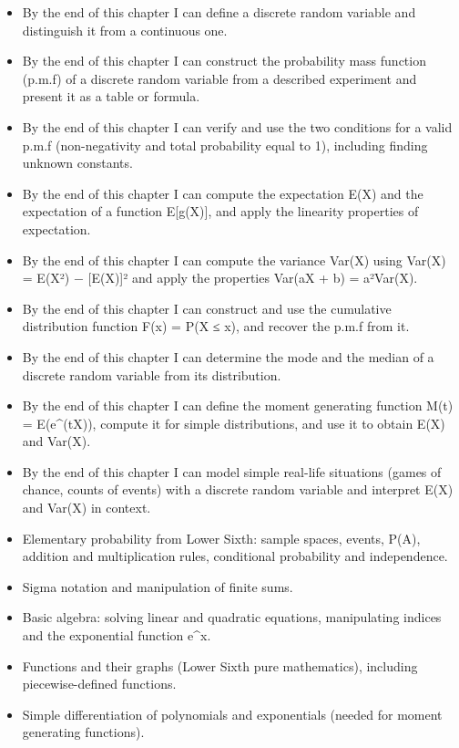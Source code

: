 \documentclass[11pt]{article}
\begin{document}
\begin{objectifs}
\begin{itemize}
\item By the end of this chapter I can define a discrete random variable and distinguish it from a continuous one.
\item By the end of this chapter I can construct the probability mass function (p.m.f) of a discrete random variable from a described experiment and present it as a table or formula.
\item By the end of this chapter I can verify and use the two conditions for a valid p.m.f (non-negativity and total probability equal to 1), including finding unknown constants.
\item By the end of this chapter I can compute the expectation E(X) and the expectation of a function E[g(X)], and apply the linearity properties of expectation.
\item By the end of this chapter I can compute the variance Var(X) using Var(X) = E(X²) − [E(X)]² and apply the properties Var(aX + b) = a²Var(X).
\item By the end of this chapter I can construct and use the cumulative distribution function F(x) = P(X ≤ x), and recover the p.m.f from it.
\item By the end of this chapter I can determine the mode and the median of a discrete random variable from its distribution.
\item By the end of this chapter I can define the moment generating function M(t) = E(e\^{}(tX)), compute it for simple distributions, and use it to obtain E(X) and Var(X).
\item By the end of this chapter I can model simple real-life situations (games of chance, counts of events) with a discrete random variable and interpret E(X) and Var(X) in context.
\end{itemize}
\end{objectifs}

\begin{prerequis}
\begin{itemize}
\item Elementary probability from Lower Sixth: sample spaces, events, P(A), addition and multiplication rules, conditional probability and independence.
\item Sigma notation and manipulation of finite sums.
\item Basic algebra: solving linear and quadratic equations, manipulating indices and the exponential function e\^{}x.
\item Functions and their graphs (Lower Sixth pure mathematics), including piecewise-defined functions.
\item Simple differentiation of polynomials and exponentials (needed for moment generating functions).
\end{itemize}
\end{prerequis}
\end{document}
